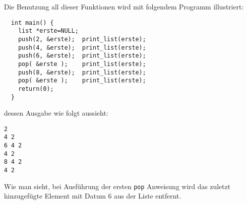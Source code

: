 Die Benutzung all dieser Funktionen wird mit folgendem Programm illustriert:
\begin{lstlisting}
  int main() {
    list *erste=NULL;
    push(2, &erste);  print_list(erste);
    push(4, &erste);  print_list(erste);
    push(6, &erste);  print_list(erste);
    pop( &erste );    print_list(erste);
    push(8, &erste);  print_list(erste);
    pop( &erste );    print_list(erste);
    return(0);
  }
\end{lstlisting}
dessen Ausgabe wie folgt aussieht:
\begin{verbatim}
2	
4 2
6 4 2	
4 2
8 4 2	
4 2
\end{verbatim}
Wie man sieht, bei Ausführung der ersten \texttt{pop} Anweisung wird das zuletzt hinzugefügte Element mit Datum $6$ aus der Liste entfernt.

\endinput

